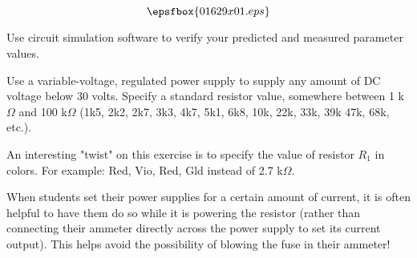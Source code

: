

$$\epsfbox{01629x01.eps}$$

\vfil \eject






Use circuit simulation software to verify your predicted and measured parameter values.







Use a variable-voltage, regulated power supply to supply any amount of DC voltage below 30 volts.  Specify a standard resistor value, somewhere between 1 k$\Omega$ and 100 k$\Omega$ (1k5, 2k2, 2k7, 3k3, 4k7, 5k1, 6k8, 10k, 22k, 33k, 39k 47k, 68k, etc.).

An interesting "twist" on this exercise is to specify the value of resistor $R_1$ in colors.  For example: Red, Vio, Red, Gld instead of 2.7 k$\Omega$.

\vskip 10pt

When students set their power supplies for a certain amount of current, it is often helpful to have them do so while it is powering the resistor (rather than connecting their ammeter directly across the power supply to set its current output).  This helps avoid the possibility of blowing the fuse in their ammeter!




